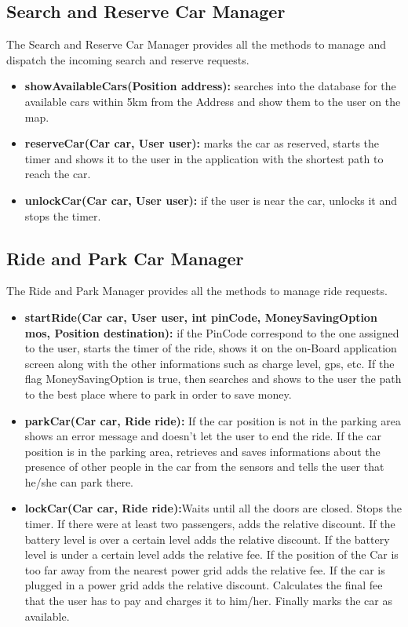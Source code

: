 \newcommand\tab[1][1cm]{\hspace*{#1}}

\subsection{Search and Reserve Car Manager}
The Search and Reserve Car Manager provides all the methods to manage and dispatch the incoming search and reserve requests.\\
\begin{itemize}
\item \textbf{showAvailableCars(Position address):} searches into the database for the available cars within 5km from the Address and show them to the user on the map.

\item \textbf{reserveCar(Car car, User user):} marks the car as reserved, starts the timer and shows it to the user in the application with the shortest path to reach the car.

\item \textbf{unlockCar(Car car, User user):} if the user is near the car, unlocks it and stops the timer.
\end{itemize}

\subsection{Ride and Park Car Manager}
The Ride and Park Manager provides all the methods to manage ride requests.\\
\begin{itemize}
\item \textbf{startRide(Car car, User user, int pinCode, MoneySavingOption mos, Position destination):} if the PinCode correspond to the one assigned to the user, starts the timer of the ride, shows it on the on-Board application screen along with the other informations such as charge level, gps, etc. If the flag MoneySavingOption is true, then searches and shows to the user the path to the best place where to park in order to save money.

\item \textbf{parkCar(Car car, Ride ride):} If the car position is not in the parking area shows an error message and doesn't let the user to end the ride. If the car position is in the parking area, retrieves and saves informations about the presence of other people in the car from the sensors and tells the user that he/she can park there.

\item \textbf{lockCar(Car car, Ride ride):}Waits until all the doors are closed. Stops the timer. If there were at least two passengers, adds the relative discount. If the battery level is over a certain level adds the relative discount. If the battery level is under a certain level adds the relative fee. If the position of the Car is too far away from the nearest power grid adds the relative fee. If the car is plugged in a power grid adds the relative discount. Calculates the final fee that the user has to pay and charges it to him/her. Finally marks the car as available.
\end{itemize}

